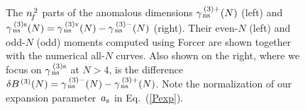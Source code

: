 \documentclass[12pt]{article}
\begin{document}
\pagebreak

\begin{figure}[tb]
\vspace{-2mm}
\centerline{}
\vspace{-2mm}
\caption{ \label{fig:gnsnf2} \small
 The ${n^{\,2}_{\! f}}$ parts of the anomalous dimensions $\gamma_{\,\rm ns}^{\:(3)+}(N)$
 (left) and $\gamma_{\,\rm ns}^{\:(3)\rm s}(N) = 
 \gamma_{\,\rm ns}^{\:(3)\rm v}(N) - \gamma_{\,\rm ns}^{\:(3)-}(N)$ (right).
 Their even-$N$ (left) and odd-$N$ (odd) moments computed using {\sc Forcer}
 \cite{tuLL2016,FORCER} are shown together with the numerical all-$N$ curves.
 Also shown on the right, where we focus on $\gamma_{\,\rm ns}^{\:(3)\rm s}$ at 
 $N > 4$, is the difference $\delta B^{\,(3)}(N) = \gamma_{\,\rm ns}^{\:(3)-}(N) 
 - \gamma_{\,\rm ns}^{\:(3)+}(N)$. Note the normalization of our expansion 
 parameter~$a_{\rm s}$ in Eq.~(\ref{Pexp}). }
\vspace{-1mm}
\end{figure}
\end{document}
